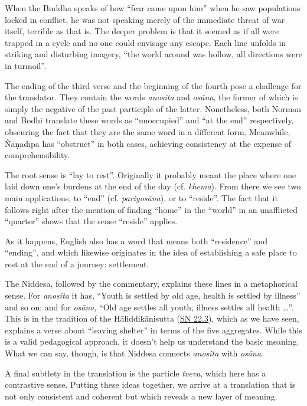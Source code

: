 \documentclass[12pt,openany]{book}%
\begin{document}
When the Buddha speaks of how “fear came upon him” when he saw populations locked in conflict, he was not speaking merely of the immediate threat of war itself, terrible as that is. The deeper problem is that it seemed as if all were trapped in a cycle and no one could envisage any escape. Each line unfolds in striking and disturbing imagery, “the world around was hollow, all directions were in turmoil”.

The ending of the third verse and the beginning of the fourth pose a challenge for the translator. They contain the words \textit{anosita} and \textit{\textsanskrit{osāna}}, the former of which is simply the negative of the past participle of the latter. Nonetheless, both Norman and Bodhi translate these words as “unoccupied” and “at the end” respectively, obscuring the fact that they are the same word in a different form. Meanwhile, \textsanskrit{Ñāṇadīpa} has “obstruct” in both cases, achieving consistency at the expense of comprehensibility.

The root sense is “lay to rest”. Originally it probably meant the place where one laid down one’s burdens at the end of the day (cf. \textit{khema}). From there we see two main applications, to “end” (cf. \textit{\textsanskrit{pariyosāna}}), or to “reside”. The fact that it follows right after the mention of finding “home” in the “world” in an unafflicted “quarter” shows that the sense “reside” applies.

As it happens, English also has a word that means both “residence” and “ending”, and which likewise originates in the idea of establishing a safe place to rest at the end of a journey: settlement.

The Niddesa, followed by the commentary, explains these lines in a metaphorical sense. For \textit{anosita} it has, “Youth is settled by old age, health is settled by illness” and so on; and for \textit{\textsanskrit{osāna}}, “Old age settles all youth, illness settles all health …”. This is in the tradition of the \textsanskrit{Hāliddikānisutta} (\href{https://suttacentral.net/sn22.3/en/sujato}{SN 22.3}), which as we have seen, explains a verse about “leaving shelter” in terms of the five aggregates. While this is a valid pedagogical approach, it doesn’t help us understand the basic meaning. What we can say, though, is that Niddesa connects \textit{anosita} with \textit{\textsanskrit{osāna}}.

A final subtlety in the translation is the particle \textit{tveva}, which here has a contrastive sense. Putting these ideas together, we arrive at a translation that is not only consistent and coherent but which reveals a new layer of meaning.
\end{document}
